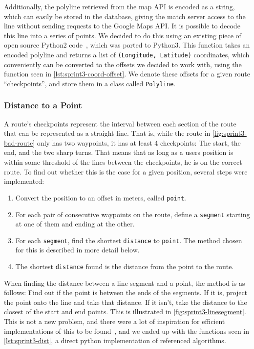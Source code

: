 Additionally, the polyline retrieved from the map API is encoded as a string, which can easily be stored in the database, giving the match server access to the line without sending requests to the Google Maps \ac{API}. It is possible to decode this line into a series of points. We decided to do this using an existing piece of open source Python2 code~\citep{decodepolyline}, which was ported to Python3. This function takes an encoded polyline and returns a list of \texttt{(Longitude, Latitude)} coordinates, which conveniently can be converted to the offsets we decided to work with, using the function seen in \autoref{lst:sprint3-coord-offset}. We denote these offsets for a given route ``checkpoints'', and store them in a class called \texttt{Polyline}.

\subsubsection{Distance to a Point}
A route's checkpoints represent the interval between each section of the route that can be represented as a straight line. That is, while the route in \autoref{fig:sprint3-bad-route} only has two waypoints, it has at least 4 checkpoints: The start, the end, and the two sharp turns. That means that as long as a users position is within some threshold of the lines between the checkpoints, he is on the correct route. To find out whether this is the case for a given position, several steps were implemented:

\begin{enumerate}
	\item{Convert the position to an offset in meters, called \texttt{point}.}
	\item{For each pair of consecutive waypoints on the route, define a \texttt{segment} starting at one of them and ending at the other.}
	\item{For each \texttt{segment}, find the shortest \texttt{distance} to \texttt{point}. The method chosen for this is described in more detail below.}
	\item{The shortest \texttt{distance} found is the distance from the point to the route.}
\end{enumerate}

When finding the distance between a line segment and a point, the method is as follows: Find out if the point is between the ends of the segments. If it is, project the point onto the line and take that distance. If it isn't, take the distance to the closest of the start and end points. This is illustrated in \autoref{fig:sprint3-linesegment}. This is not a new problem, and there were a lot of inspiration for efficient implementations of this to be found~\citep{point2line1,point2line2}, and we ended up with the functions seen in \autoref{lst:sprint3-dist}, a direct python implementation of referenced algorithms.

